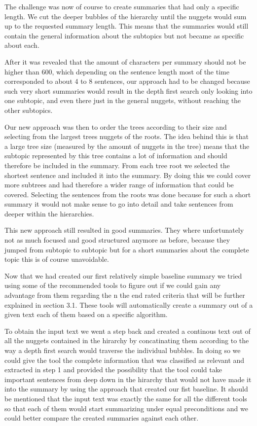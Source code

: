 The challenge was now of course to create summaries that had only a specific length. We cut the deeper bubbles of the hierarchy until the nuggets would sum up to the requested summary length. This means that the summaries would still contain the general information about the subtopics but not became
as specific about each.

After it was revealed that the amount of characters per summary should not be
higher than 600, which depending on the sentence length most of the time
corresponded to about 4 to 8 sentences, our approach had to be changed because such very short summaries would result in the depth first search only looking into one subtopic, and even
there just in the general nuggets, without reaching the other subtopics.

Our new approach was then to order the trees according to their size and selecting from the largest trees nuggets of the roots. The idea behind this is that a large tree size (measured by the amount of nuggets in the tree) means that the subtopic represented by this tree contains a lot of information and should therefore be included in the summary. From each tree root we selected the shortest sentence and included it into the summary. By doing this we could cover more subtrees and had therefore a wider range of information that could be covered. Selecting the sentences from the roots was done because for such a short summary it would not make sense to go into detail and take sentences from deeper within the hierarchies. 

This new approach still resulted in good summaries. They where unfortunately not as much focused and
good structured anymore as before, because they jumped from subtopic to subtopic but for a short summaries about the complete topic this is of course unavoidable.

Now that we had created our first relatively simple baseline summary we tried using some of the recommended tools to figure out if we could gain any advantage from them regarding the n the end rated criteria that will be further explained in section 3.1. These tools will automatically create a summary out of a given text each of them based on a specific algorithm. 

To obtain the input text we went a step back and created a continous text out of all the nuggets contained in the hirarchy by concatinating them according to the way a depth first search would traverse the individual bubbles. In doing so we could give the tool the complete information that was classified as relevant and extracted in step 1 and provided the possibility that the tool could take important sentences from deep down in the hirarchy that would not have made it into the summary by using the approach that created our fist baseline. It should be mentioned that the input text was exactly the same for all the different tools so that each of them would start summarizing under equal preconditions and we could better compare the created summaries against each other. 

